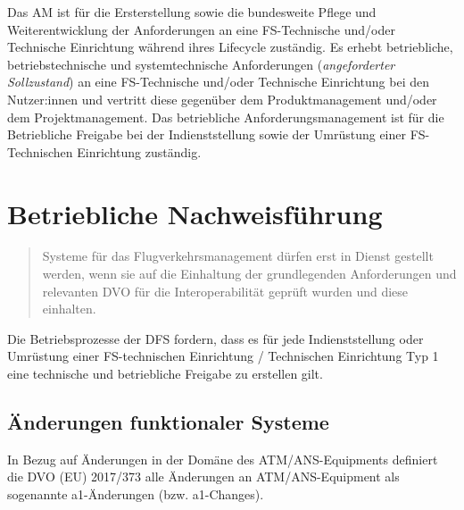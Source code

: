 Das \acf{AM} ist für die Ersterstellung sowie die bundesweite Pflege und Weiterentwicklung der Anforderungen an eine FS-Technische und/oder Technische Einrichtung während ihres Lifecycle zuständig. 
Es erhebt betriebliche, betriebstechnische und systemtechnische Anforderungen (\textit{angeforderter Sollzustand}) an eine FS-Technische und/oder Technische Einrichtung bei den Nutzer:innen und vertritt diese gegenüber dem Produktmanagement und/oder dem Projektmanagement. 
Das betriebliche Anforderungsmanagement ist für die Betriebliche Freigabe bei der Indienststellung sowie der Umrüstung einer FS-Technischen Einrichtung zuständig. \cite[31]{ba_technik}


    \section{Betriebliche Nachweisführung}

\begin{quote}
    Systeme für das Flugverkehrsmanagement dürfen erst in Dienst gestellt werden, wenn sie auf die
Einhaltung der grundlegenden Anforderungen und relevanten DVO für die Interoperabilität
geprüft wurden und diese einhalten. \cite[17]{baf_iop}
\end{quote}


Die Betriebsprozesse der \ac{DFS} fordern, dass es für jede Indienststellung oder Umrüstung einer FS-technischen Einrichtung / Technischen Einrichtung Typ 1 eine technische und betriebliche Freigabe zu erstellen gilt. \cite{fa_freigaben}

\subsection{Änderungen funktionaler Systeme}


In Bezug auf Änderungen in der Domäne des ATM/ANS-Equipments definiert die DVO (EU) 2017/373 alle Änderungen an ATM/ANS-Equipment als sogenannte a1-Änderungen (bzw. a1-Changes).




